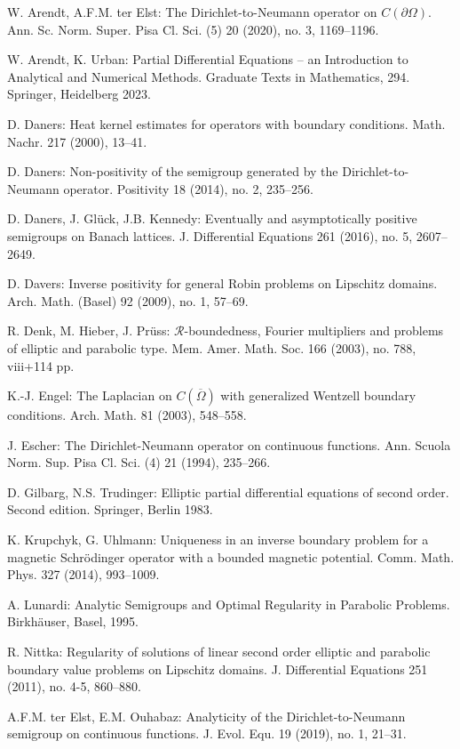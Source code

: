 \begin{thebibliography}{99}
 W. Arendt, A.F.M. ter Elst: The Dirichlet-to-Neumann operator on $C(\partial\Omega)$. Ann. Sc. Norm. Super. Pisa Cl. Sci. (5) 20 (2020), no. 3, 1169--1196.

 W. Arendt, K. Urban: Partial Differential Equations -- an Introduction to Analytical and Numerical Methods. Graduate Texts in Mathematics, 294. Springer, Heidelberg 2023.

 D. Daners: Heat kernel estimates for operators with boundary conditions. Math. Nachr. 217 (2000), 13--41.

 D. Daners: Non-positivity of the semigroup generated by the Dirichlet-to-Neumann operator. Positivity 18 (2014), no. 2, 235--256.

 D. Daners, J. Glück, J.B. Kennedy: Eventually and asymptotically positive semigroups on Banach lattices. J. Differential Equations 261 (2016), no. 5, 2607--2649.

 D. Davers: Inverse positivity for general Robin problems on Lipschitz domains. Arch. Math. (Basel) 92 (2009),  no. 1, 57--69.

 R. Denk, M. Hieber, J. Prüss: $\mathcal{R}$-boundedness, Fourier multipliers and problems of elliptic and parabolic type. Mem. Amer. Math. Soc. 166 (2003), no. 788, viii+114 pp.

 K.-J. Engel: The Laplacian on $C(\overline{\Omega})$ with generalized Wentzell boundary conditions. Arch. Math. 81 (2003), 548--558.

 J. Escher: The Dirichlet-Neumann operator on continuous functions. Ann. Scuola Norm. Sup. Pisa Cl. Sci. (4) 21 (1994), 235--266.

 D. Gilbarg, N.S. Trudinger: Elliptic partial differential equations of second order. Second edition. Springer, Berlin 1983.

 K. Krupchyk, G. Uhlmann: Uniqueness in an inverse boundary problem for a magnetic Schrödinger operator with a bounded magnetic potential. Comm. Math. Phys. 327 (2014), 993--1009.

 A. Lunardi: Analytic Semigroups and Optimal Regularity in Parabolic Problems. Birkhäuser, Basel, 1995.

 R. Nittka: Regularity of solutions of linear second order elliptic and parabolic boundary value problems on Lipschitz domains. J. Differential Equations 251 (2011), no. 4-5, 860--880.

 A.F.M. ter Elst, E.M. Ouhabaz: Analyticity of the Dirichlet-to-Neumann semigroup on continuous functions. J. Evol. Equ. 19 (2019), no. 1, 21--31.

\end{thebibliography}

%